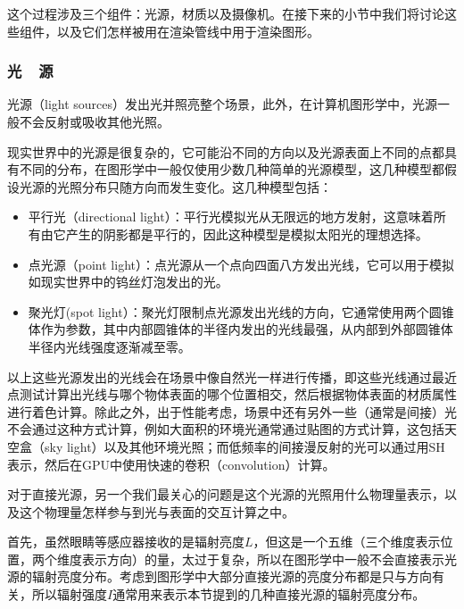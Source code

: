 这个过程涉及三个组件：光源，材质以及摄像机。在接下来的小节中我们将讨论这些组件，以及它们怎样被用在渲染管线中用于渲染图形。




\subsubsection{光~~源}\label{sec:intro-light-sources}
光源（light sources）发出光并照亮整个场景，此外，在计算机图形学中，光源一般不会反射或吸收其他光照。

现实世界中的光源是很复杂的，它可能沿不同的方向以及光源表面上不同的点都具有不同的分布，在图形学中一般仅使用少数几种简单的光源模型，这几种模型都假设光源的光照分布只随方向而发生变化。这几种模型包括：

\begin{itemize}
	\item 平行光（directional light）：平行光模拟光从无限远的地方发射，这意味着所有由它产生的阴影都是平行的，因此这种模型是模拟太阳光的理想选择。
	\item 点光源（point light）：点光源从一个点向四面八方发出光线，它可以用于模拟如现实世界中的钨丝灯泡发出的光。
	\item 聚光灯(spot light）：聚光灯限制点光源发出光线的方向，它通常使用两个圆锥体作为参数，其中内部圆锥体的半径内发出的光线最强，从内部到外部圆锥体半径内光线强度逐渐减至零。
\end{itemize}

以上这些光源发出的光线会在场景中像自然光一样进行传播，即这些光线通过最近点测试计算出光线与哪个物体表面的哪个位置相交，然后根据物体表面的材质属性进行着色计算。除此之外，出于性能考虑，场景中还有另外一些（通常是间接）光不会通过这种方式计算，例如大面积的环境光通常通过贴图的方式计算，这包括天空盒（sky light）以及其他环境光照；而低频率的间接漫反射的光可以通过用SH表示，然后在GPU中使用快速的卷积（convolution）计算。

对于直接光源，另一个我们最关心的问题是这个光源的光照用什么物理量表示，以及这个物理量怎样参与到光与表面的交互计算之中。

首先，虽然眼睛等感应器接收的是辐射亮度$L$，但这是一个五维（三个维度表示位置，两个维度表示方向）的量，太过于复杂，所以在图形学中一般不会直接表示光源的辐射亮度分布。考虑到图形学中大部分直接光源的亮度分布都是只与方向有关，所以辐射强度$I$通常用来表示本节提到的几种直接光源的辐射亮度分布。

